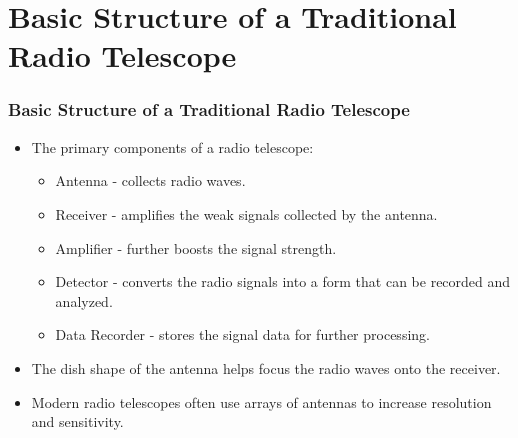 \documentclass[handout, %
	11pt, %
]{beamer}
\begin{document}
\section{Basic Structure of a Traditional Radio Telescope}
\begin{frame}
    \frametitle{Basic Structure of a Traditional Radio Telescope}
    \begin{itemize}
        \item The primary components of a radio telescope:
            \begin{itemize}
                \item Antenna - collects radio waves.
                \item Receiver - amplifies the weak signals collected by the antenna.
                \item Amplifier - further boosts the signal strength.
                \item Detector - converts the radio signals into a form that can be recorded and analyzed.
                \item Data Recorder - stores the signal data for further processing.
            \end{itemize}
        \item The dish shape of the antenna helps focus the radio waves onto the receiver.
        \item Modern radio telescopes often use arrays of antennas to increase resolution and sensitivity.
    \end{itemize}
\end{frame}

\end{document}

